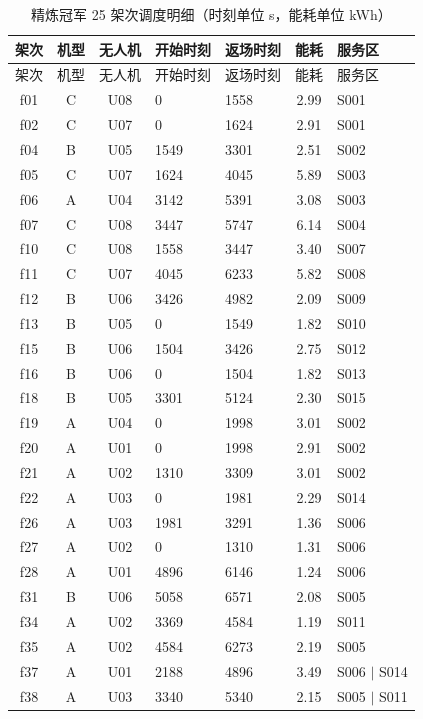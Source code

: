 \begin{longtable}{cccllcl}
\caption{精炼冠军 25 架次调度明细（时刻单位 s，能耗单位 kWh）}
\label{tab:p2flights}\\
\toprule 架次 & 机型 & 无人机 & 开始时刻 & 返场时刻 & 能耗 & 服务区 \\ \midrule \endfirsthead
\toprule 架次 & 机型 & 无人机 & 开始时刻 & 返场时刻 & 能耗 & 服务区 \\ \midrule \endhead
f01 & C & U08 & 0 & 1558 & 2.99 & S001 \\
f02 & C & U07 & 0 & 1624 & 2.91 & S001 \\
f04 & B & U05 & 1549 & 3301 & 2.51 & S002 \\
f05 & C & U07 & 1624 & 4045 & 5.89 & S003 \\
f06 & A & U04 & 3142 & 5391 & 3.08 & S003 \\
f07 & C & U08 & 3447 & 5747 & 6.14 & S004 \\
f10 & C & U08 & 1558 & 3447 & 3.40 & S007 \\
f11 & C & U07 & 4045 & 6233 & 5.82 & S008 \\
f12 & B & U06 & 3426 & 4982 & 2.09 & S009 \\
f13 & B & U05 & 0 & 1549 & 1.82 & S010 \\
f15 & B & U06 & 1504 & 3426 & 2.75 & S012 \\
f16 & B & U06 & 0 & 1504 & 1.82 & S013 \\
f18 & B & U05 & 3301 & 5124 & 2.30 & S015 \\
f19 & A & U04 & 0 & 1998 & 3.01 & S002 \\
f20 & A & U01 & 0 & 1998 & 2.91 & S002 \\
f21 & A & U02 & 1310 & 3309 & 3.01 & S002 \\
f22 & A & U03 & 0 & 1981 & 2.29 & S014 \\
f26 & A & U03 & 1981 & 3291 & 1.36 & S006 \\
f27 & A & U02 & 0 & 1310 & 1.31 & S006 \\
f28 & A & U01 & 4896 & 6146 & 1.24 & S006 \\
f31 & B & U06 & 5058 & 6571 & 2.08 & S005 \\
f34 & A & U02 & 3369 & 4584 & 1.19 & S011 \\
f35 & A & U02 & 4584 & 6273 & 2.19 & S005 \\
f37 & A & U01 & 2188 & 4896 & 3.49 & S006 $|$ S014 \\
f38 & A & U03 & 3340 & 5340 & 2.15 & S005 $|$ S011 \\
\bottomrule
\end{longtable}